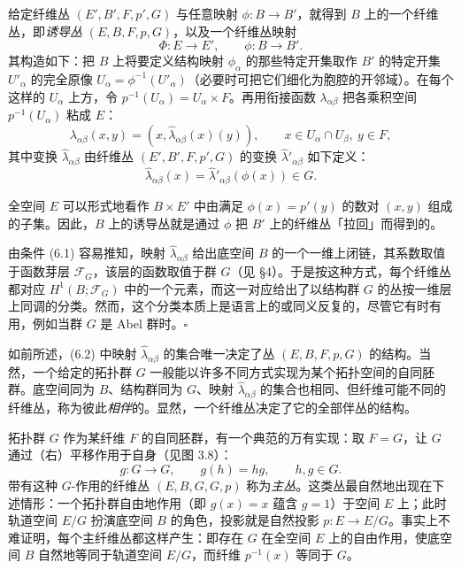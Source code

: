 给定纤维丛 $(E',B',F,p',G)$ 与任意映射 $\phi:B\to B'$，就得到 $B$ 上的一个纤维丛，即\emph{诱导丛} $(E,B,F,p,G)$，以及一个纤维丛映射
\[
\Phi:E\longrightarrow E',\qquad\phi:B\longrightarrow B'.
\]
其构造如下：把 $B$ 上将要定义结构映射 $\phi_\alpha$ 的那些特定开集取作 $B'$ 的特定开集 $U'_\alpha$ 的完全原像 $U_\alpha=\phi^{-1}(U'_\alpha)$（必要时可把它们细化为胞腔的开邻域）。在每个这样的 $U_\alpha$ 上方，令 $p^{-1}(U_\alpha)=U_\alpha\times F$。再用衔接函数 $\lambda_{\alpha\beta}$ 把各乘积空间 $p^{-1}(U_\alpha)$ 粘成 $E$：
\[
\lambda_{\alpha\beta}(x,y)=(x,\hat\lambda_{\alpha\beta}(x)(y)),\qquad x\in U_\alpha\cap U_\beta,\ y\in F,
\]
其中变换 $\hat\lambda_{\alpha\beta}$ 由纤维丛 $(E',B',F,p',G)$ 的变换 $\hat\lambda'_{\alpha\beta}$ 如下定义：
\[
\hat\lambda_{\alpha\beta}(x)=\hat\lambda'_{\alpha\beta}(\phi(x))\in G.
\]

全空间 $E$ 可以形式地看作 $B\times E'$ 中由满足 $\phi(x)=p'(y)$ 的数对 $(x,y)$ 组成的子集。因此，$B$ 上的诱导丛就是通过 $\phi$ 把 $B'$ 上的纤维丛「拉回」而得到的。

\begin{remark}{}
由条件 (6.1) 容易推知，映射 $\hat\lambda_{\alpha\beta}$ 给出底空间 $B$ 的一个一维上闭链，其系数取值于函数芽层 $\mathcal{F}_G$，该层的函数取值于群 $G$（见 §4）。于是按这种方式，每个纤维丛都对应 $H^1(B;\mathcal{F}_G)$ 中的一个元素，而这一对应给出了以结构群 $G$ 的丛按一维层上同调的分类。然而，这个分类本质上是语言上的或同义反复的，尽管它有时有用，例如当群 $G$ 是 Abel 群时。\hfill$\square$
\end{remark}

如前所述，(6.2) 中映射 $\hat\lambda_{\alpha\beta}$ 的集合唯一决定了丛 $(E,B,F,p,G)$ 的结构。当然，一个给定的拓扑群 $G$ 一般能以许多不同方式实现为某个拓扑空间的自同胚群。底空间同为 $B$、结构群同为 $G$、映射 $\hat\lambda_{\alpha\beta}$ 的集合也相同、但纤维可能不同的纤维丛，称为彼此\emph{相伴}的。显然，一个纤维丛决定了它的全部伴丛的结构。

拓扑群 $G$ 作为某纤维 $F$ 的自同胚群，有一个典范的万有实现：取 $F=G$，让 $G$ 通过（右）平移作用于自身（见图 3.8）：
\begin{equation}
g:G\longrightarrow G,\qquad g(h)=hg,\qquad h,g\in G. \tag{6.3}
\end{equation}
带有这种 $G$-作用的纤维丛 $(E,B,G,G,p)$ 称为\emph{主丛}。这类丛最自然地出现在下述情形：一个拓扑群自由地作用（即 $g(x)=x$ 蕴含 $g=1$）于空间 $E$ 上；此时轨道空间 $E/G$ 扮演底空间 $B$ 的角色，投影就是自然投影 $p:E\to E/G$。事实上不难证明，每个主纤维丛都这样产生：即存在 $G$ 在全空间 $E$ 上的自由作用，使底空间 $B$ 自然地等同于轨道空间 $E/G$，而纤维 $p^{-1}(x)$ 等同于 $G$。


